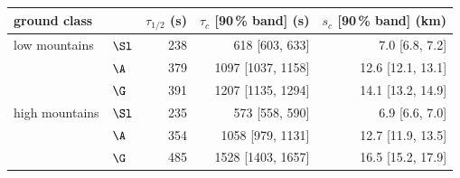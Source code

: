 \begin{tabular}{@{}l l r r r@{}}
\toprule
ground class & & $\tau_{1/2}$ (s) & $\tau_c$ [90\,\% band] (s) & $s_c$ [90\,\% band] (km) \\
\midrule
low mountains & $\Sl$ & 238 & 618 [603, 633] & 7.0 [6.8, 7.2] \\
 & $\A$ & 379 & 1097 [1037, 1158] & 12.6 [12.1, 13.1] \\
 & $\G$ & 391 & 1207 [1135, 1294] & 14.1 [13.2, 14.9] \\
\addlinespace[2pt]
high mountains & $\Sl$ & 235 & 573 [558, 590] & 6.9 [6.6, 7.0] \\
 & $\A$ & 354 & 1058 [979, 1131] & 12.7 [11.9, 13.5] \\
 & $\G$ & 485 & 1528 [1403, 1657] & 16.5 [15.2, 17.9] \\
\bottomrule
\end{tabular}
